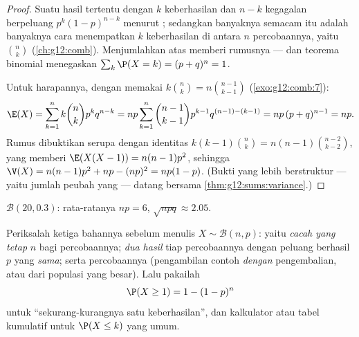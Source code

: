 \begin{proof}
Suatu  hasil tertentu dengan $k$ keberhasilan dan $n-k$ kegagalan
berpeluang $p^k(1-p)^{n-k}$ menurut ; sedangkan banyaknya  semacam itu
adalah banyaknya cara menempatkan $k$ keberhasilan di antara $n$ percobaannya,
yaitu $\binom nk$ (\cref{ch:g12:comb}). Menjumlahkan atas  memberi
rumusnya --- dan teorema binomial menegaskan
$\sum_k \P(X = k) = (p + q)^n = 1$.

Untuk harapannya, dengan memakai $k\binom nk = n\binom{n-1}{k-1}$
(\cref{exo:g12:comb:7}):
\[
\E(X) = \sum_{k=1}^{n} k\binom nk p^k q^{n-k}
= np\sum_{k=1}^{n} \binom{n-1}{k-1} p^{k-1} q^{(n-1)-(k-1)}
= np\,(p + q)^{n-1} = np .
\]
Rumus  dibuktikan serupa dengan identitas
$k(k-1)\binom nk = n(n-1)\binom{n-2}{k-2}$, yang memberi
$\E(X(X-1)) = n(n-1)p^2$, sehingga
$\V(X) = n(n-1)p^2 + np - (np)^2 = np(1-p)$. (Bukti yang lebih berstruktur --- yaitu
 jumlah peubah yang  --- datang bersama
\cref{thm:g12:sums:variance}.)
\end{proof}

\begin{omfigure}

{\small {} $\mathcal B(20, 0.3)$: rata-ratanya $np = 6$,  $\sqrt{npq} \approx 2.05$.}
\end{omfigure}

\begin{method}\label{met:g12:randvar:recognize}
Periksalah ketiga bahannya sebelum menulis $X \sim \mathcal B(n,p)$: yaitu
\emph{cacah yang tetap} $n$ bagi percobaannya; \emph{dua hasil} tiap percobaannya dengan
peluang berhasil $p$ yang \emph{sama}; serta \emph{} percobaannya
(pengambilan contoh \emph{dengan} pengembalian, atau dari populasi yang besar). Lalu pakailah
\[
\P(X \geq 1) = 1 - (1-p)^n
\]
untuk ``sekurang-kurangnya satu keberhasilan'', dan kalkulator atau tabel kumulatif untuk
$\P(X \leq k)$ yang umum.
\end{method}

